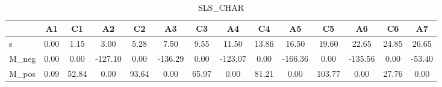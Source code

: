 \begin{table}[H]
\caption{SLS_CHAR}
\begin{tabular}{lSSSSSSSSSSSSS}
\toprule
{} & {A1} & {C1} & {A2} & {C2} & {A3} & {C3} & {A4} & {C4} & {A5} & {C5} & {A6} & {C6} & {A7} \\
\midrule
s & 0.00 & 1.15 & 3.00 & 5.28 & 7.50 & 9.55 & 11.50 & 13.86 & 16.50 & 19.60 & 22.65 & 24.85 & 26.65 \\
M_neg & 0.00 & 0.00 & -127.10 & 0.00 & -136.29 & 0.00 & -123.07 & 0.00 & -166.36 & 0.00 & -135.56 & 0.00 & -53.40 \\
M_pos & 0.09 & 52.84 & 0.00 & 93.64 & 0.00 & 65.97 & 0.00 & 81.21 & 0.00 & 103.77 & 0.00 & 27.76 & 0.00 \\
\bottomrule
\end{tabular}
\end{table}
